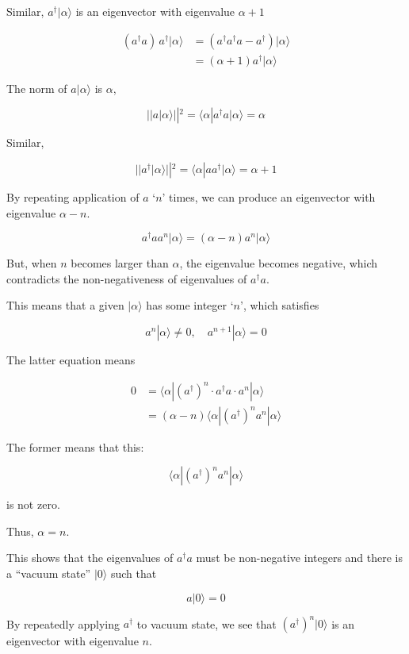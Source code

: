 ﻿\documentclass[twoside]{book}
\numberwithin{equation}{section}
\begin{document}
Similar, $a^{\dagger}|\alpha\rangle$ is an eigenvector with eigenvalue $\alpha + 1$

\[\begin{split}
(a^{\dagger}a)\,a^{\dagger}|\alpha\rangle &= \left(a^{\dagger}a^{\dagger}a -a^{\dagger}\right)|\alpha\rangle \\
&=(\alpha + 1)a^{\dagger}|\alpha\rangle
\end{split}\]

The norm of $a|\alpha\rangle$ is $\alpha$,

\[||a|\alpha\rangle||^2 = \langle\alpha|a^{\dagger}a|\alpha\rangle = \alpha \]

Similar,

\[||a^{\dagger}|\alpha\rangle||^2 = \langle\alpha|aa^{\dagger}|\alpha\rangle = \alpha + 1 \]

By repeating application of $a$ `$n$' times, we can produce an eigenvector with eigenvalue $\alpha - n$.

\[a^{\dagger}a a^n|\alpha\rangle = (\alpha - n)a^n|\alpha\rangle \]

But, when $n$ becomes larger than $\alpha$, the eigenvalue becomes negative, which contradicts the non-negativeness of eigenvalues of $a^{\dagger}a$.

This means that a given $|\alpha\rangle$ has some integer `$n$', which satisfies

\[a^n|\alpha\rangle \neq 0,\quad a^{n+1}|\alpha\rangle = 0 \]

The latter equation means

\[\begin{split}
0 &= \langle\alpha|(a^{\dagger})^n \cdot a^{\dagger}a\cdot a^n|\alpha\rangle\\
&=(\alpha - n)\langle\alpha|(a^{\dagger})^n a^n|\alpha\rangle
\end{split} \]

The former means that this:

\[\langle\alpha|(a^{\dagger})^n a^n|\alpha\rangle \]

is not zero.

Thus, $\alpha = n$.

This shows that the eigenvalues of $a^{\dagger}a$ must be non-negative integers and there is a ``vacuum state'' $|0\rangle$ such that

\[a|0\rangle = 0 \]

By repeatedly applying $a^{\dagger}$ to vacuum state, we see that $(a^{\dagger})^n|0\rangle$ is an eigenvector with eigenvalue $n$.
\end{document}
